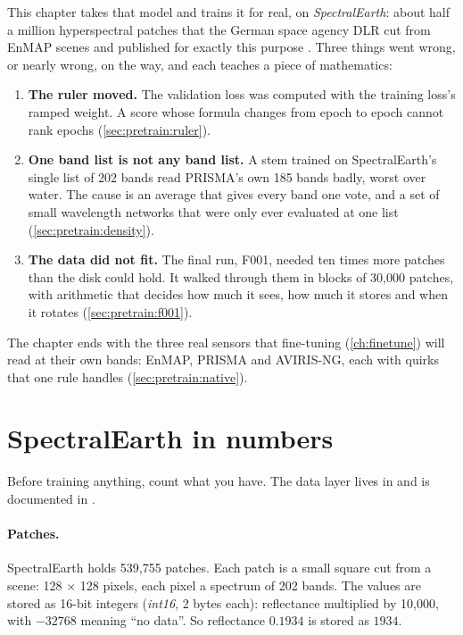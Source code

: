 This chapter takes that model and trains it for real, on \emph{SpectralEarth}: about half a
million hyperspectral patches that the German space agency DLR cut from EnMAP scenes and published for exactly
this purpose \citep{braham2024spectralearth}. Three things went wrong, or nearly wrong, on the way, and each
teaches a piece of mathematics:
\begin{enumerate}
  \item \textbf{The ruler moved.} The validation loss was computed with the training loss's ramped weight. A score
    whose formula changes from epoch to epoch cannot rank epochs (\cref{sec:pretrain:ruler}).
  \item \textbf{One band list is not any band list.} A stem trained on SpectralEarth's single list of 202 bands read
    PRISMA's own 185 bands badly, worst over water. The cause is an average that gives every band one vote, and a
    set of small wavelength networks that were only ever evaluated at one list (\cref{sec:pretrain:density}).
  \item \textbf{The data did not fit.} The final run, F001, needed ten times more patches than the disk could hold.
    It walked through them in blocks of 30,000 patches, with arithmetic that decides how much it sees, how much it
    stores and when it rotates (\cref{sec:pretrain:f001}).
\end{enumerate}
The chapter ends with the three real sensors that fine-tuning (\cref{ch:finetune}) will read at their own bands:
EnMAP, PRISMA and AVIRIS-NG, each with quirks that one rule handles (\cref{sec:pretrain:native}).

\section{SpectralEarth in numbers}\label{sec:pretrain:se}

Before training anything, count what you have. The data layer lives in  and is
documented in .

\paragraph{Patches.} SpectralEarth holds 539,755\tbrk{} patches. Each
patch is a small square cut from a scene: 128 $\times$ 128 pixels, each pixel a spectrum of 202 bands.
The values are stored as 16-bit integers (\emph{int16}, 2 bytes each): reflectance multiplied by 10,000, with
$-32768$ meaning ``no data''. So reflectance $0.1934$ is stored as $1934$.

